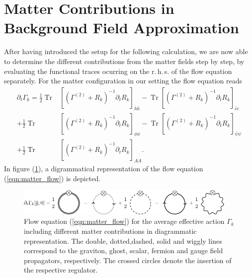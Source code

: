 \section{Matter Contributions in Background Field Approximation}
After having introduced the setup for the following calculation, we are now able to determine the different contributions from the matter fields step by step, by evaluating the functional traces ocurring on the r.\,h.\,s. of the flow equation separately. For the matter configuration in our setting the flow equation reads
\begin{equation}
\begin{aligned}
 \partial_t\Gamma_{k} =\frac{1}{2} \operatorname{Tr}&\left[\left(\Gamma^{(2)}+R_{k}\right)^{-1} \partial_t R_{k}\right]_{h h} - \operatorname{Tr}\left[\left(\Gamma^{(2)}+R_{k}\right)^{-1} \partial_t R_{k}\right]_{\bar{c}c}\\[10pt]
 + \frac{1}{2}\operatorname{Tr}&\left[\left(\Gamma^{(2)}+R_{k}\right)^{-1} \partial_t R_{k}\right]_{\phi\phi}  -\operatorname{Tr}\left[\left(\Gamma^{(2)}+R_{k}\right)^{-1}\partial_t R_{k}\right]_{\bar{\psi} \psi} \\[10pt]
 +\frac{1}{2} \operatorname{Tr}&\left[\left(\Gamma^{(2)}+R_{k}\right)^{-1}\partial_t R_{k}\right]_{AA}.\end{aligned}
\label{eqn:matter_flow}
\end{equation}
In figure (\ref{fig:matter_calc}), a digrammatical representation of the flow equation (\ref{eqn:matter_flow}) is depicted.
\begin{figure}[t]
	\centering
	\includegraphics[width=0.95\textwidth]{figs/TikZ/matter_corrections}
\caption[Flow equation for the average effective action $\Gamma_k$ including different matter contributions in diagrammatic representation.]{Flow equation (\ref{eqn:matter_flow}) for the average effective action $\Gamma_k$ including different matter contributions in diagrammatic representation. The double, dotted,dashed, solid and  wiggly lines correspond to the graviton, ghost, scalar, fermion and gauge field  propagators, respectively. The crossed circles denote the insertion of the respective regulator.}
	\label{fig:matter_calc}
	\hrulefill
\end{figure}


